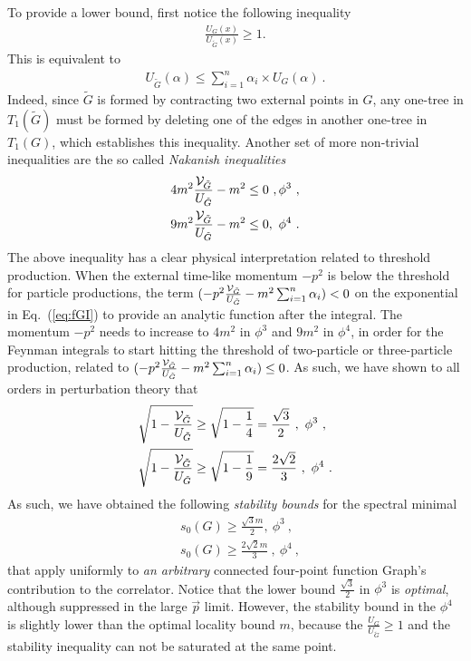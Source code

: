 \documentclass[a4paper,11pt]{article}
\begin{document}
To provide a lower bound,  first notice the following inequality
\begin{align}
\frac{U_G(x)}{U_{\tilde G}(x)} \ge 1 . 
\end{align}
This is equivalent to 
\begin{align}
U_{\tilde G}(\alpha) \le \sum_{i=1}^n\alpha_i \times U_G(\alpha) \ .
\end{align}
Indeed, since $\tilde G$ is formed by contracting two external points in $G$, any one-tree in $T_1(\tilde G)$ must be formed by deleting one of the edges in another one-tree in $T_1(G)$, which establishes this inequality. Another set of more non-trivial inequalities are the so called {\it Nakanish inequalities}~\cite{Nakanishi1961,Jaffe1965}
\begin{align}
&4m^2\frac{{\cal V}_{\tilde G}}{U_{\tilde G}}-m^2 \le 0 \ ,  \phi^3 \ , \\
&9m^2\frac{{\cal V}_{\tilde G}}{U_{\tilde G}}-m^2 \le 0,  \ \phi^4 \ . 
\end{align}
The above inequality has a clear physical interpretation related to threshold production. When the external time-like momentum $-p^2$ is below the threshold for particle productions, the term $(-p^2\frac{{\cal V}_{\tilde G}}{U_{\tilde G}}-m^2\sum_{i=1}^n\alpha_i)<0$ on the exponential in Eq.~(\ref{eq:fGI}) to provide an analytic function after the integral. The momentum $-p^2$ needs to increase to $4m^2$ in $\phi^3$ and $9m^2$ in $\phi^4$, in order for the Feynman integrals to start hitting the threshold of two-particle or three-particle production, related to $(-p^2\frac{{\cal V}_{\tilde G}}{U_{\tilde G}}-m^2\sum_{i=1}^n\alpha_i) \leq 0$. As such, we have shown to all orders in perturbation theory that 
\begin{align}
&\sqrt{1-\frac{{\cal V}_{\tilde G}}{U_{\tilde G}}} \ge \sqrt{1-\frac{1}{4}}= \frac{\sqrt{3}}{2} \ ,  \  \phi^3 \ ,  \\
&\sqrt{1-\frac{{\cal V}_{\tilde G}}{U_{\tilde G}}} \ge \sqrt{1-\frac{1}{9}}= \frac{2\sqrt{2}}{3}  \ ,  \ \phi^4 \ . 
\end{align}
As such, we have obtained the following {\it stability bounds} for the spectral minimal
\begin{align}
&s_0(G) \ge \frac{\sqrt{3}m}{2},  \ \phi^3 \ , \\
&s_0(G) \ge \frac{2\sqrt{2}m}{3} \ , \ \phi^4 \ ,
\end{align}
that apply uniformly to {\it an arbitrary} connected four-point function Graph's contribution to the correlator. Notice that the lower bound $\frac{\sqrt{3}}{2}$ in $\phi^3$ is {\it optimal}, although suppressed in the large $\vec{p}$ limit. However, the stability bound in the $\phi^4$ is slightly lower than the optimal locality bound $m$, because the $\frac{U_G}{U_{\tilde G}} \ge 1$ and the stability inequality can not be saturated at the same point. 
\end{document}
